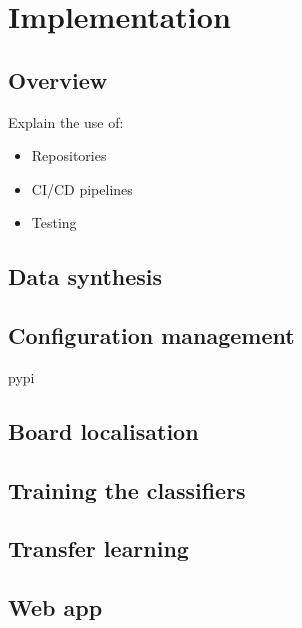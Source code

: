 \documentclass[../main.tex]{subfiles}
\begin{document}
\chapter{Implementation}
\section{Overview}

Explain the use of:
\begin{itemize}
    \item Repositories
    \item CI/CD pipelines
    \item Testing
\end{itemize}

\section{Data synthesis}
\section{Configuration management}
\gls{pypi}

\section{Board localisation}
\section{Training the classifiers}
\section{Transfer learning}
\section{Web app}
\end{document}
